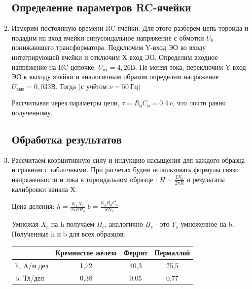 \documentclass[11pt]{article}
\begin{document}
\begin{enumerate}
\subsection{Определение параметров RC-ячейки}

\item Измерим постоянную времени RC-ячейки. Для этого разберем цепь тороида и подадим на вход ячейки синусоидальное напряжение с обмотки $U_0$ понижающего трансформатора. 
Подключим Y-вход ЭО ко входу интегрирующей ячейки и отключим Х-вход ЭО. Определим входное напряжение на RC-цепочке: $U_{\text{вх}} = 4,26 \text{В}$.
Не меняя тока, переключим Y-вход ЭО к выходу ячейки  и аналогичным образом определим напряжение $U_{\text{вых}}= 0,033 \text{В}$. Тогда (с учётом $\nu = 50~\text{Гц}$)
\begin{center}
\end{center}
Рассчитывая через параметры цепи, $\tau = R_\text{и} C_\text{и} = 0.4~\text{c}$, что почти равно полученному.

\subsection{Обработка результатов}
\item  Рассчитаем коэрцитивную силу и индукцию насыщения для каждого образца и сравним с табличными. При расчетах будем использовать формулы связи напряженности и тока в тороидальном образце : $H = \frac{IN_0}{2\pi R}$ и результаты калибровки канала Х.

Цена деления:
$h = \frac{K_xN_0}{2\pi R R_0}$
$b = \frac{K_yR_uC_u}{S N_u}$

Умножая $X_c$ на h получаем $H_c$, аналогично $B_s$ - это $Y_s$ умноженное на b.
Полученные h и b для всех образцов:

\begin{table}[h]
\centering
\begin{tabular}{|l|c|c|c|}
\hline
           & \multicolumn{1}{l|}{Кремнистое железо} & \multicolumn{1}{l|}{Феррит} & \multicolumn{1}{l|}{Пермаллой} \\ \hline
h, A/м дел & 1,72                                  & 40,3                        & 25,5                           \\ \hline
b, Тл/дел  & 0,38                                   & 0,05                        & 0,77                          \\ \hline
\end{tabular}
\end{table}



\end{enumerate}
\end{document}
